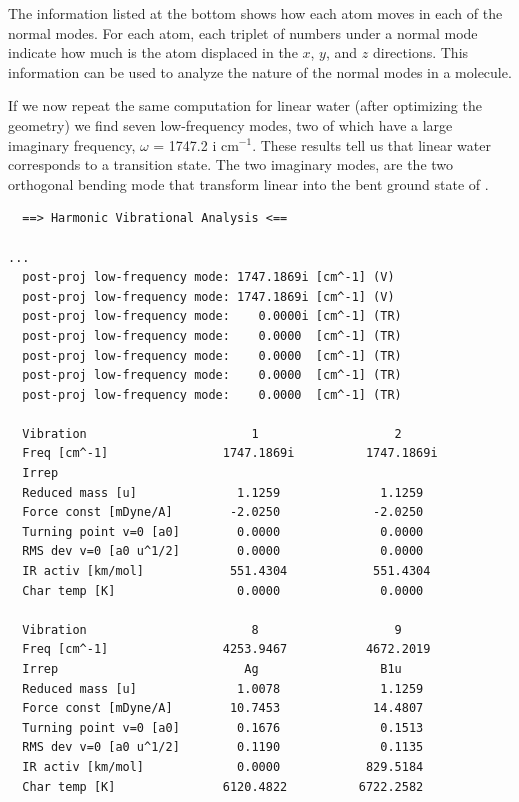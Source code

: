\documentclass[../Main/chem371-notes.tex]{subfiles}
\begin{document}
The information listed at the bottom shows how each atom moves in each of the normal modes.
For each atom, each triplet of numbers under a normal mode indicate how much is the atom displaced in the $x$, $y$, and $z$ directions.
This information can be used to analyze the nature of the normal modes in a molecule.

If we now repeat the same computation for linear water (after optimizing the geometry) we find seven low-frequency modes, two of which have a large imaginary frequency, $\omega$ = 1747.2 i cm$^{-1}$.
These results tell us that linear water corresponds to a transition state.
The two imaginary modes, are the two orthogonal bending mode that transform linear  into the bent ground state of .

\pagebreak

\begin{small}
\begin{verbatim}
  ==> Harmonic Vibrational Analysis <==

...
  post-proj low-frequency mode: 1747.1869i [cm^-1] (V)
  post-proj low-frequency mode: 1747.1869i [cm^-1] (V)
  post-proj low-frequency mode:    0.0000i [cm^-1] (TR)
  post-proj low-frequency mode:    0.0000  [cm^-1] (TR)
  post-proj low-frequency mode:    0.0000  [cm^-1] (TR)
  post-proj low-frequency mode:    0.0000  [cm^-1] (TR)
  post-proj low-frequency mode:    0.0000  [cm^-1] (TR)

  Vibration                       1                   2           
  Freq [cm^-1]                1747.1869i          1747.1869i                 
  Irrep                                                                             
  Reduced mass [u]              1.1259              1.1259                      
  Force const [mDyne/A]        -2.0250             -2.0250                     
  Turning point v=0 [a0]        0.0000              0.0000                      
  RMS dev v=0 [a0 u^1/2]        0.0000              0.0000                      
  IR activ [km/mol]            551.4304            551.4304                     
  Char temp [K]                 0.0000              0.0000                  
  
  Vibration                       8                   9           
  Freq [cm^-1]                4253.9467           4672.2019       
  Irrep                          Ag                 B1u          
  Reduced mass [u]              1.0078              1.1259        
  Force const [mDyne/A]        10.7453             14.4807        
  Turning point v=0 [a0]        0.1676              0.1513        
  RMS dev v=0 [a0 u^1/2]        0.1190              0.1135        
  IR activ [km/mol]             0.0000            829.5184       
  Char temp [K]               6120.4822          6722.2582       
 
\end{verbatim}
\end{small}
\end{document}

